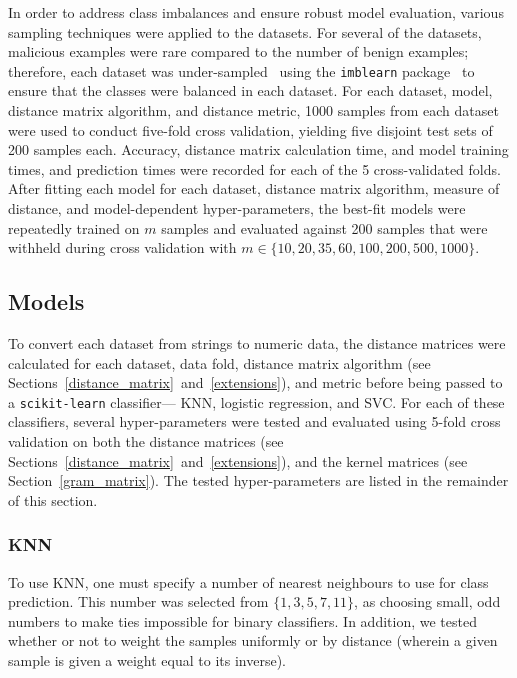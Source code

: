 \documentclass[preprint,12pt]{elsarticle}
\begin{document}
In order to address class imbalances and ensure robust model evaluation, various sampling techniques were applied to the datasets.
For several of the datasets, malicious examples were rare compared to the number of benign examples; therefore, each dataset was under-sampled~\cite{undersampling} using the \texttt{imblearn} package~\cite{imblearn} to ensure that the classes were balanced in each dataset.
For each dataset, model, distance matrix algorithm, and distance metric, 1000 samples from each dataset were used to conduct five-fold cross validation, yielding five disjoint test sets of 200 samples each.
Accuracy, distance matrix calculation time, and model training times, and prediction times were recorded for each of the 5 cross-validated folds.
After fitting each model for each dataset, distance matrix algorithm, measure of distance, and model-dependent hyper-parameters, the best-fit models were repeatedly trained on $m$ samples and evaluated against 200 samples that were withheld during cross validation with $m \in \{ 10, 20, 35, 60, 100, 200, 500, 1000\}$.



\subsection{Models}
\label{models}

To convert each dataset from strings to numeric data, the distance matrices were calculated for each dataset, data fold, distance matrix algorithm (see Sections~\ref{distance_matrix}~and~\ref{extensions}), and metric before being passed to a \texttt{scikit-learn} classifier--- KNN, logistic regression, and SVC.
For each of these classifiers, several hyper-parameters were tested and evaluated using 5-fold cross validation on both the distance matrices (see Sections~\ref{distance_matrix}~and~\ref{extensions}), and the kernel matrices (see Section~\ref{gram_matrix}).
The tested hyper-parameters are listed in the remainder of this section.



\subsubsection{KNN}

To use KNN, one must specify a number of nearest neighbours to use for class prediction. This number was selected from $\{1,3,5,7,11\}$, as choosing small, odd numbers to make ties impossible for binary classifiers. In addition, we tested whether or not to weight the samples uniformly or by distance (wherein a given sample is given a weight equal to its inverse).
\end{document}
